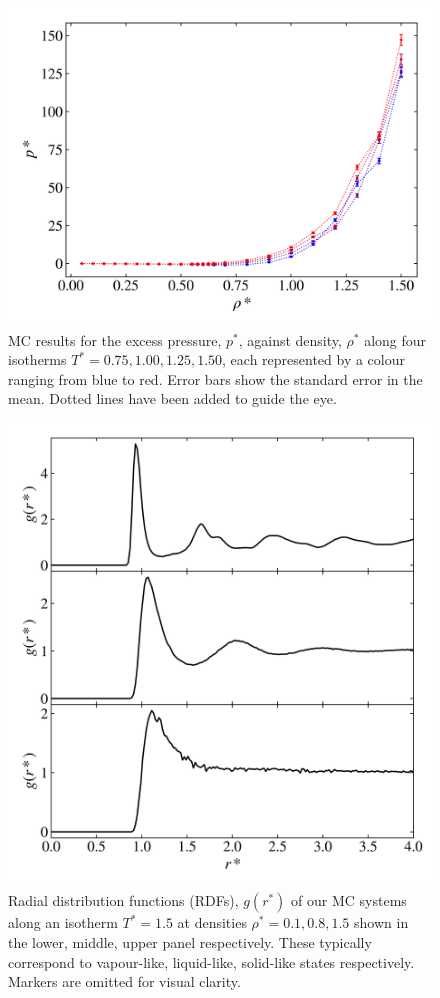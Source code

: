 \documentclass[10pt, twocolumn]{revtex4}    %
\begin{document}
\begin{figure}
	\includegraphics[width=\linewidth]{figures/excessEnergyPressure/excessPressure.png}
	\caption{MC results for the excess pressure, $p^{*}$, against density, $\rho{}^{*}$ along four isotherms $T^{*}=0.75, 1.00, 1.25, 1.50$, each represented by a colour ranging from blue to red. Error bars show the standard error in the mean. Dotted lines have been added to guide the eye.}
	\label{fig:excessPressure}
\end{figure}


\begin{figure}
	\includegraphics[width=\linewidth]{figures/rdfs/RDFs.png}
	\caption{Radial distribution functions (RDFs), $g(r^{*})$ of our MC systems along an isotherm $T^{*}=1.5$ at densities $\rho{}^{*}=0.1, 0.8, 1.5$ shown in the lower, middle, upper panel respectively. These typically correspond to vapour-like, liquid-like, solid-like states respectively. Markers are omitted for visual clarity.}
	\label{fig:RDFs}
\end{figure}
\end{document}
